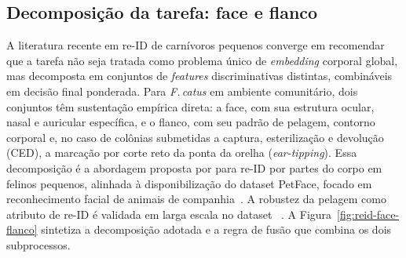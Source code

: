 \subsection*{Decomposição da tarefa: face e flanco}

A literatura recente em re-ID de carnívoros pequenos converge em recomendar que a tarefa não seja tratada como problema único de \textit{embedding} corporal global, mas decomposta em conjuntos de \textit{features} discriminativas distintas, combináveis em decisão final ponderada. Para \textit{F.\,catus} em ambiente comunitário, dois conjuntos têm sustentação empírica direta: a face, com sua estrutura ocular, nasal e auricular específica, e o flanco, com seu padrão de pelagem, contorno corporal e, no caso de colônias submetidas a captura, esterilização e devolução (CED), a marcação por corte reto da ponta da orelha (\textit{ear-tipping}). Essa decomposição é a abordagem proposta por  para re-ID por partes do corpo em felinos pequenos, alinhada à disponibilização do dataset PetFace, focado em reconhecimento facial de animais de companhia~\cite{shinoda2024petface}. A robustez da pelagem como atributo de re-ID é validada em larga escala no dataset \modeloWildlife~\cite{adam2024wildlifereid10k}. A Figura~\ref{fig:reid-face-flanco} sintetiza a decomposição adotada e a regra de fusão que combina os dois subprocessos.

